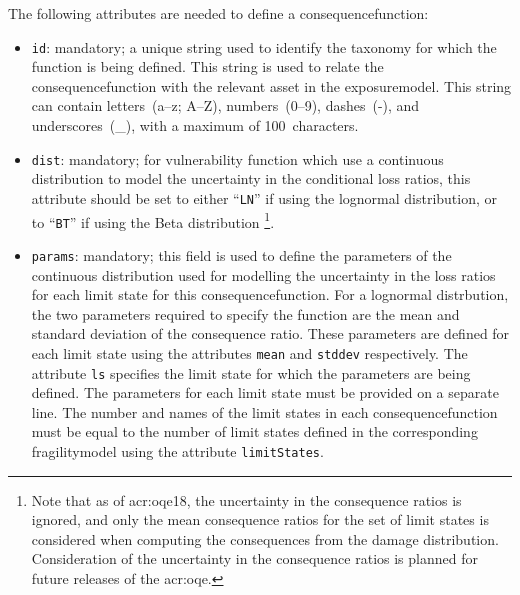 \inputminted[firstline=11,firstnumber=11,lastline=16,fontsize=\footnotesize,frame=single,linenos,bgcolor=lightgray]{xml}{oqum/risk/Verbatim/input_consequence.xml}

The following attributes are needed to define a \gls{consequencefunction}:

\begin{itemize}

  \item \Verb+id+: mandatory; a unique string used to identify the 
    \gls{taxonomy} for which the function is being defined. This string is used
    to relate the \gls{consequencefunction} with the relevant \gls{asset} in the 
    \gls{exposuremodel}. This string can contain letters~(a--z; A--Z),
    numbers~(0--9), dashes~(-), and underscores~(\_), with a maximum of
    100~characters.

  \item \Verb+dist+: mandatory; for vulnerability function which use a continuous 
    distribution to model the uncertainty in the conditional loss ratios, 
    this attribute should be set to either ``\Verb+LN+'' if using the lognormal
    distribution, or to ``\Verb+BT+'' if using the Beta distribution
    \footnote{Note that as of \glsdesc{acr:oqe18}, the uncertainty in the 
    consequence ratios is ignored, and only the mean consequence ratios for the
    set of limit states is considered when computing the consequences from the
    damage distribution. Consideration of the uncertainty in the consequence
    ratios is planned for future releases of the \glsdesc{acr:oqe}.}.

  \item \Verb+params+: mandatory; this field is used to define the parameters of 
    the continuous distribution used for modelling the uncertainty in the
    loss ratios for each limit state for this 
    \gls{consequencefunction}. For a lognormal distrbution, 
    the two parameters required to specify the function are the mean and 
    standard deviation of the consequence ratio. These parameters are defined for 
    each limit state using the attributes \Verb+mean+ and \Verb+stddev+ 
    respectively. The attribute \Verb+ls+ specifies the limit state for which 
    the parameters are being defined. The parameters for each limit state
    must be provided on a separate line. The number and names of the limit 
    states in each \gls{consequencefunction} must be equal to the number of limit 
    states defined in the corresponding \gls{fragilitymodel}
    using the attribute \Verb+limitStates+.

\end{itemize}